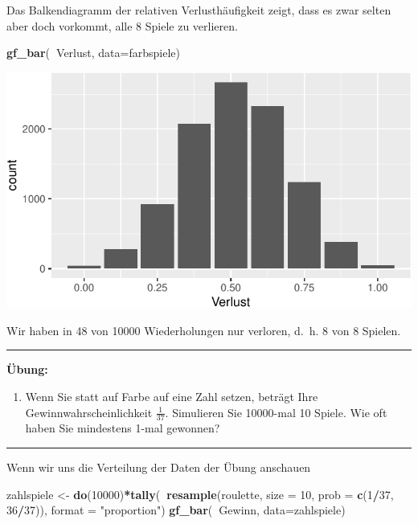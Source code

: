 \documentclass[12pt,ngerman,paper=a4,pagesize,DIV=13]{scrreprt}
\newenvironment{Shaded}{\begin{snugshade}}{\end{snugshade}}
\newcommand{\DataTypeTok}[1]{\textcolor[rgb]{0.13,0.29,0.53}{#1}}
\newcommand{\DecValTok}[1]{\textcolor[rgb]{0.00,0.00,0.81}{#1}}
\newcommand{\KeywordTok}[1]{\textcolor[rgb]{0.13,0.29,0.53}{\textbf{#1}}}
\newcommand{\NormalTok}[1]{#1}
\newcommand{\OperatorTok}[1]{\textcolor[rgb]{0.81,0.36,0.00}{\textbf{#1}}}
\newcommand{\StringTok}[1]{\textcolor[rgb]{0.31,0.60,0.02}{#1}}
\providecommand{\tightlist}{%
  \setlength{\itemsep}{0pt}\setlength{\parskip}{0pt}}
\begin{document}
Das Balkendiagramm der relativen Verlusthäufigkeit zeigt, dass es zwar
selten aber doch vorkommt, alle 8 Spiele zu verlieren.

\begin{Shaded}
\begin{Highlighting}[]
\KeywordTok{gf_bar}\NormalTok{(}\OperatorTok{~}\NormalTok{Verlust, }\DataTypeTok{data=}\NormalTok{farbspiele)}
\end{Highlighting}
\end{Shaded}

\includegraphics{DatenerhebungStatistik-Uebung_files/figure-latex/unnamed-chunk-79-1.pdf}

Wir haben in 48 von 10000 Wiederholungen nur verloren, d.~h. 8 von 8
Spielen.

\begin{center}\rule{0.5\linewidth}{\linethickness}\end{center}

\textbf{Übung:}

\begin{enumerate}
\def\labelenumi{\arabic{enumi}.}
\tightlist
\item
  Wenn Sie statt auf Farbe auf eine Zahl setzen, beträgt Ihre
  Gewinnwahrscheinlichkeit \(\frac{1}{37}\). Simulieren Sie 10000-mal 10
  Spiele. Wie oft haben Sie mindestens 1-mal gewonnen?
\end{enumerate}

\begin{center}\rule{0.5\linewidth}{\linethickness}\end{center}

Wenn wir uns die Verteilung der Daten der Übung anschauen

\begin{Shaded}
\begin{Highlighting}[]
\NormalTok{zahlspiele <-}\StringTok{ }\KeywordTok{do}\NormalTok{(}\DecValTok{10000}\NormalTok{)}\OperatorTok{*}\KeywordTok{tally}\NormalTok{(}\OperatorTok{~}\KeywordTok{resample}\NormalTok{(roulette, }\DataTypeTok{size =} \DecValTok{10}\NormalTok{, }
                  \DataTypeTok{prob =} \KeywordTok{c}\NormalTok{(}\DecValTok{1}\OperatorTok{/}\DecValTok{37}\NormalTok{, }\DecValTok{36}\OperatorTok{/}\DecValTok{37}\NormalTok{)), }\DataTypeTok{format =} \StringTok{"proportion"}\NormalTok{)}
\KeywordTok{gf_bar}\NormalTok{(}\OperatorTok{~}\NormalTok{Gewinn, }\DataTypeTok{data=}\NormalTok{zahlspiele)}
\end{Highlighting}
\end{Shaded}
\end{document}
